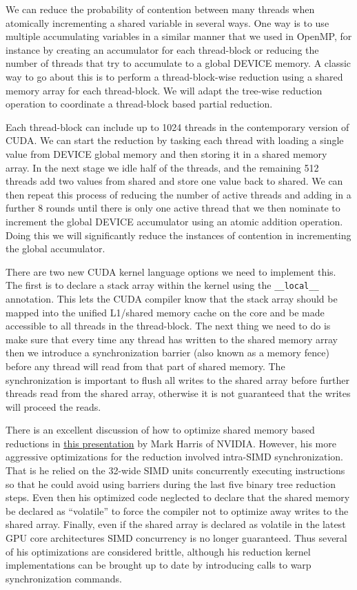 We can reduce the probability of contention between many threads when atomically incrementing a shared variable in several ways. One way is to use multiple accumulating variables in a similar manner that we used in OpenMP, for instance by creating an accumulator for each thread-block or reducing the number of threads that try to accumulate to a global DEVICE memory. A classic way to go about this is to perform a thread-block-wise reduction using a shared memory array for each thread-block. We will adapt the tree-wise reduction operation to coordinate a thread-block based partial reduction.

Each thread-block can include up to 1024 threads in the contemporary version of CUDA. We can start the reduction by tasking each thread with loading a single value from DEVICE global memory and then storing it in a shared memory array. In the next stage we idle half of the threads, and the remaining 512 threads add two values from shared and store one value back to shared. We can then repeat this process of reducing the number of active threads and adding in a further 8 rounds until there is only one active thread that we then nominate to increment the global DEVICE accumulator using an atomic addition operation. Doing this we will significantly reduce the instances of contention in incrementing the global accumulator.

There are two new CUDA kernel language options we need to implement this. The first is to declare a stack array within the kernel using the \texttt{\_\_local\_\_} annotation. This lets the CUDA compiler know that the stack array should be mapped into the unified L1/shared memory cache on the core and be made accessible to all threads in the thread-block. The next thing we need to do is make sure that every time any thread has written to the shared memory array then we introduce a synchronization barrier (also known as a memory fence) before any thread will read from that part of shared memory. The synchronization is important to flush all writes to the shared array before further threads read from the shared array, otherwise it is not guaranteed that the writes will proceed the reads.

There is an excellent discussion of how to optimize shared memory based reductions in \href{https://developer.download.nvidia.com/assets/cuda/files/reduction.pdf}{this presentation} by Mark Harris of NVIDIA. However, his more aggressive optimizations for the reduction involved intra-SIMD synchronization. That is he relied on the 32-wide SIMD units concurrently executing instructions so that he could avoid using barriers during the last five binary tree reduction steps. Even then his optimized code neglected to declare that the shared memory be declared as ``volatile'' to force the compiler not to optimize away writes to the shared array. Finally, even if the shared array is declared as volatile in the latest GPU core architectures SIMD concurrency is no longer guaranteed. Thus several of his optimizations are considered brittle, although his reduction kernel  implementations can be brought up to date by introducing calls to warp synchronization commands.

